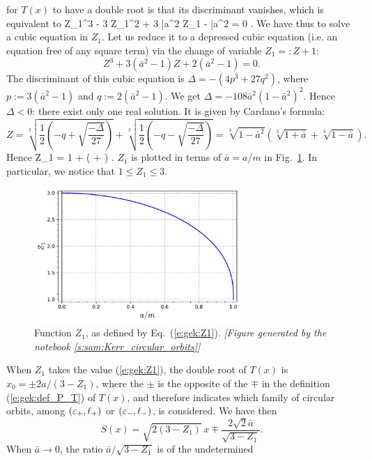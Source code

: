 for $T(x)$ to have a double root is that its discriminant vanishes, which is
equivalent to
\be \label{e:gek:cubic_Z1}
  Z_1^3 - 3 Z_1^2 + 3 \bar{a}^2 Z_1 - \bar{a}^2 = 0 .
\ee
We have thus to solve a cubic equation in $Z_1$. Let us reduce it to a depressed
cubic equation (i.e. an equation free of any square term) via the change
of variable $Z_1 =: Z + 1$:
\[
    Z^3 + 3 (\bar{a}^2 - 1) Z + 2 (\bar{a}^2 - 1) = 0 .
\]
The discriminant of this cubic equation is
$\Delta = - (4 p^3 + 27 q^2)$, where $p:= 3 (\bar{a}^2 - 1)$
and $q:=2 (\bar{a}^2 - 1)$. We get $\Delta = - 108 \bar{a}^2 (1 - \bar{a}^2)^2$.
Hence $\Delta < 0$: there exist only one real solution. It is given by
Cardano's formula:
\[
    Z = \sqrt[3]{ \frac{1}{2} \left(-q + \sqrt{\frac{-\Delta}{27}} \right) }
        + \sqrt[3]{ \frac{1}{2} \left(-q - \sqrt{\frac{-\Delta}{27}} \right) }
    = \sqrt[3]{1 - \bar{a}^2} \left( \sqrt[3]{1 + \bar{a}} + \sqrt[3]{1 - \bar{a}} \right) .
\]
Hence
\be \label{e:gek:Z1}
    Z_1 = 1 +  \left(  +  \right) .
\ee
$Z_1$ is plotted in terms of $\bar{a} = a/m$ in Fig.~\ref{f:gek:Z1}.
In particular, we notice that $1 \leq Z_1 \leq 3$.
\begin{figure}
\centerline{\includegraphics[width=0.7\textwidth]{gek_Z1.pdf}}
\caption[]{\label{f:gek:Z1} \footnotesize
Function $Z_1$, as defined by Eq.~(\ref{e:gek:Z1}).
\textsl{[Figure generated by the notebook \ref{s:sam:Kerr_circular_orbits}]}
}
\end{figure}
When $Z_1$ takes the value (\ref{e:gek:Z1}), the double root of $T(x)$ is
$x_0 = \pm {2a}/(3-Z_1)$, where the $\pm$ is the opposite of the $\mp$
in the definition (\ref{e:gek:def_P_T}) of $T(x)$, and therefore indicates
which family of  circular orbits, among $(\varepsilon_+,\ell_+)$ or $(\varepsilon_-,\ell_-)$,
is considered. We have then
\[
    S(x) = \sqrt{2(3-Z_1)} \, x \mp \frac{2\sqrt{2} \bar{a}}{\sqrt{3 - Z_1}} .
\]
When $\bar{a}\to 0$, the ratio $\bar{a}/\sqrt{3 - Z_1}$ is of the undetermined
